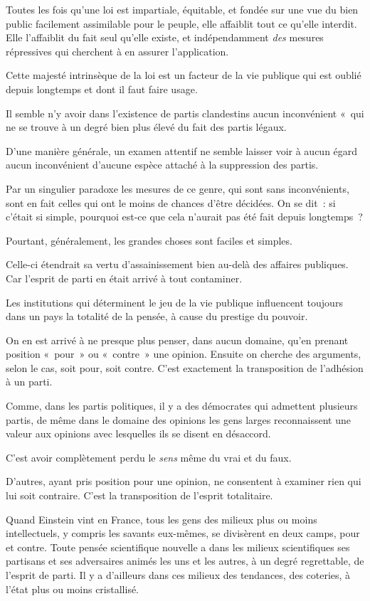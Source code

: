 \documentclass[french,twoside]{book} %
\begin{document}
Toutes les fois qu’une loi est impartiale, équitable, et fondée sur une vue du bien public facilement assimilable pour le peuple, elle affaiblit tout ce qu’elle interdit. Elle l’affaiblit du fait seul qu’elle existe, et indépendamment \emph{des} mesures répressives qui cherchent à en assurer l’application.\par
Cette majesté intrinsèque de la loi est un facteur de la vie publique qui est oublié depuis longtemps et dont il faut faire usage.\par
Il semble n’y avoir dans l’existence de partis clandestins aucun inconvénient « qui ne se trouve à un degré bien plus élevé du fait des partis légaux.\par
D’une manière générale, un examen attentif ne semble laisser voir à aucun égard aucun inconvénient d’aucune espèce attaché à la suppression des partis.\par
Par un singulier paradoxe les mesures de ce genre, qui sont sans inconvénients, sont en fait celles qui ont le moins de chances d’être décidées. On se dit : si c’était si simple, pourquoi est-ce que cela n’aurait pas été fait depuis longtemps ?\par
Pourtant, généralement, les grandes choses sont faciles et simples.\par
Celle-ci étendrait sa vertu d’assainissement bien au-delà des affaires publiques. Car l’esprit de parti en était arrivé à tout contaminer.\par
Les institutions qui déterminent le jeu de la vie publique influencent toujours dans un pays la totalité de la pensée, à cause du prestige du pouvoir.\par
On en est arrivé à ne presque plus penser, dans aucun domaine, qu’en prenant position « pour » ou « contre » une opinion. Ensuite on cherche des arguments, selon le cas, soit pour, soit contre. C’est exactement la transposition de l’adhésion à un parti.\par
Comme, dans les partis politiques, il y a des démocrates qui admettent plusieurs partis, de même dans le domaine des opinions les gens larges reconnaissent une valeur aux opinions avec lesquelles ils se disent en désaccord.\par
C’est avoir complètement perdu le \emph{sens} même du vrai et du faux.\par
D’autres, ayant pris position pour une opinion, ne consentent à examiner rien qui lui soit contraire. C’est la transposition de l’esprit totalitaire.\par
Quand Einstein vint en France, tous les gens des milieux plus ou moins intellectuels, y compris les savants eux-mêmes, se divisèrent en deux camps, pour et contre. Toute pensée scientifique nouvelle a dans les milieux scientifiques ses partisans et ses adversaires animés les uns et les autres, à un degré regrettable, de l’esprit de parti. Il y a d’ailleurs dans ces milieux des tendances, des coteries, à l’état plus ou moins cristallisé.\par
\end{document}
